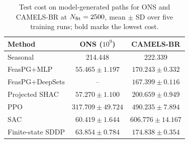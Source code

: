 \begin{table}[htbp]
\centering
\caption{Test cost on model-generated paths for ONS and CAMELS-BR at $N_{\rm fit}=2500$,
mean $\pm$ SD over five training runs; bold marks the lowest cost.}
\label{short:hydrology-table}
\begingroup
\setlength{\tabcolsep}{10pt}
\renewcommand{\arraystretch}{1.25}
\begin{tabular}{@{}lcc@{}}
\toprule
Method & ONS ($10^9$) & CAMELS-BR\\
\midrule

Seasonal & 214.448 & 222.339\\
FeasPG+MLP & {\boldmath $55.465\pm1.197$} & $170.243\pm0.332$\\
FeasPG+DeepSets & -- & {\boldmath $167.399\pm0.116$}\\
Projected SHAC & $57.270\pm1.100$ & $200.659\pm0.949$\\
PPO & $317.709\pm49.724$ & $490.235\pm7.894$\\
SAC & $60.419\pm1.644$ & $606.776\pm14.167$\\
Finite-state SDDP & $63.854\pm0.784$ & $174.838\pm0.354$\\
\bottomrule
\end{tabular}
\endgroup
\end{table}
